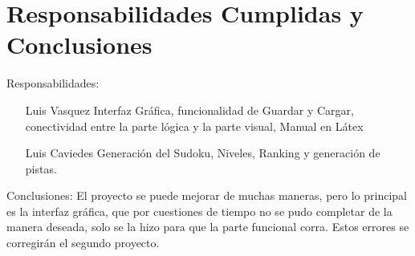 \section{Responsabilidades Cumplidas y Conclusiones}
Responsabilidades:
\begin{itemize}
\item[Luis Vasquez] Interfaz Gráfica, funcionalidad de Guardar y Cargar, conectividad entre la parte lógica y la parte visual, Manual en Látex
\end{itemize}
\begin{itemize}
\item[Luis Caviedes]Generación del Sudoku, Niveles, Ranking y generación de pistas.
\end{itemize}

Conclusiones:
El proyecto se puede mejorar de muchas maneras, pero lo principal es la interfaz gráfica, que por cuestiones de tiempo no se pudo completar de la manera deseada, solo se la hizo para que la parte funcional corra. Estos errores se corregirán el segundo proyecto.